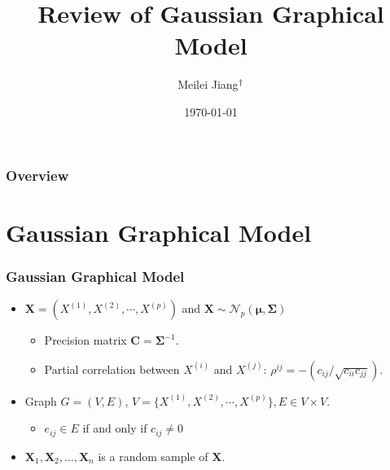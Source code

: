 \documentclass{beamer}
\date{\today} %
\title[Department of Statistics and Operations Research]{Review of Gaussian Graphical Model} %
\author[Meilei Jiang(UNC-CH)]{Meilei Jiang$^\text{\dag}$} %
\institute %
{
$^\text{\dag}$Department of Statistics and Operations Research\\
 University of North Carolina at Chapel Hill \\ %
}
\newcommand{\boldmu}{{\boldsymbol{\mu}}}
\newcommand{\boldSigma}{{\boldsymbol{\Sigma}}}
\begin{document}
\begin{frame}
\titlepage %
\end{frame}

\begin{frame}
\frametitle{Overview} %
\tableofcontents %
\end{frame}





\section{Gaussian Graphical Model}


\begin{frame}
\frametitle{Gaussian Graphical Model}
\begin{itemize}
\item $\mathbf{X} = (X^{(1)}, X^{(2)}, \cdots, X^{(p)})$ and $\mathbf{X} \sim \mathcal{N}_p(\boldmu, \boldSigma)$
    \begin{itemize}
    \item Precision matrix $\mathbf{C} = \boldSigma^{-1}$.
    \item Partial correlation between $X^{(i)}$ and $X^{(j)}$: $\rho^{ij} = -(c_{ij}/\sqrt{c_{ii}c_{jj}})$. 
    \end{itemize}
\item Graph $G = (V, E)$, $V = \{ X^{(1)}, X^{(2)}, \cdots, X^{(p)} \}, E \in V \times V$.
    \begin{itemize}
    \item $e_{ij} \in E$ if and only if $c_{ij} \neq 0$
    \end{itemize}    
\item $\mathbf{X}_1, \mathbf{X}_2, \dots, \mathbf{X}_n$ is a random sample of $\mathbf{X}$.    
\end{itemize}

\end{frame}
\end{document}
